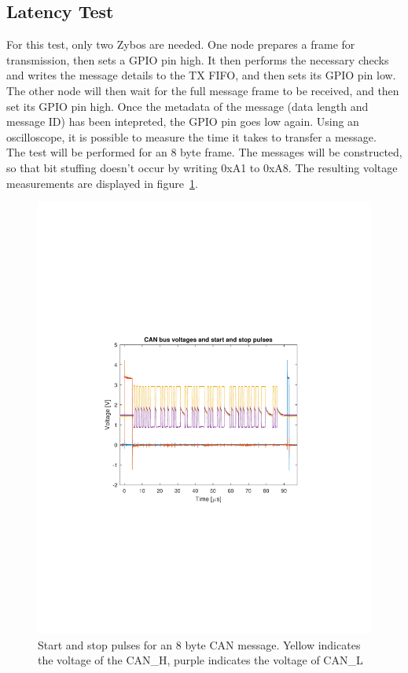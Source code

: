 \subsection{Latency Test}\label{sub:CAN_latency}
For this test, only two Zybos are needed.
One node prepares a frame for transmission, then sets a GPIO pin high.
It then performs the necessary checks and writes the message details to the TX FIFO, and then sets its GPIO pin low. \\

The other node will then wait for the full message frame to be received, and then set its GPIO pin high.
Once the metadata of the message (data length and message ID) has been intepreted, the GPIO pin goes low again.
Using an oscilloscope, it is possible to measure the time it takes to transfer a message.\\

The test will be performed for an 8 byte frame.
The messages will be constructed, so that bit stuffing doesn't occur by writing 0xA1 to 0xA8. 
The resulting voltage measurements are displayed in figure~\ref{fig:CAN_test1_raw}.\\

\begin{figure}[h]
	\centering
	\includegraphics[width = \linewidth]{graphics/CAN_test1_raw}
	\caption{Start and stop pulses for an 8 byte CAN message. Yellow indicates the voltage of the CAN\_H, purple indicates the voltage of CAN\_L}
	\label{fig:CAN_test1_raw}
\end{figure}

